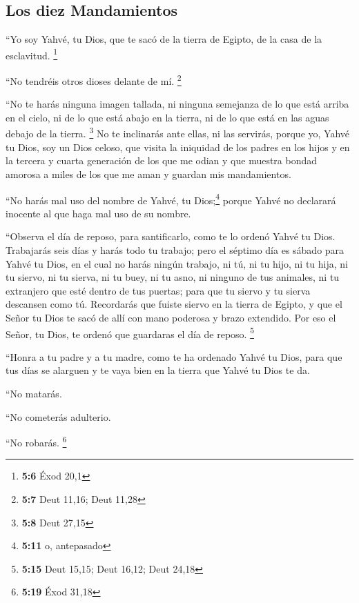 \begin{paracol}{2}
\hypertarget{los-diez-mandamientos}{%
\subsection{Los diez Mandamientos}\label{los-diez-mandamientos}}

 ``Yo soy Yahvé, tu Dios, que te sacó de la tierra de
Egipto, de la casa de la esclavitud. \footnote{\textbf{5:6} Éxod 20,1}

 ``No tendréis otros dioses delante de mí. \footnote{\textbf{5:7}
  Deut 11,16; Deut 11,28}

 ``No te harás ninguna imagen tallada, ni ninguna
semejanza de lo que está arriba en el cielo, ni de lo que está abajo en
la tierra, ni de lo que está en las aguas debajo de la tierra.
\footnote{\textbf{5:8} Deut 27,15}  No te inclinarás ante
ellas, ni las servirás, porque yo, Yahvé tu Dios, soy un Dios celoso,
que visita la iniquidad de los padres en los hijos y en la tercera y
cuarta generación de los que me odian  y que muestra
bondad amorosa a miles de los que me aman y guardan mis mandamientos.

 ``No harás mal uso del nombre de Yahvé, tu
Dios;\footnote{\textbf{5:11} o, antepasado} porque Yahvé no declarará
inocente al que haga mal uso de su nombre.

 ``Observa el día de reposo, para santificarlo, como te
lo ordenó Yahvé tu Dios.  Trabajarás seis días y harás
todo tu trabajo;  pero el séptimo día es sábado para
Yahvé tu Dios, en el cual no harás ningún trabajo, ni tú, ni tu hijo, ni
tu hija, ni tu siervo, ni tu sierva, ni tu buey, ni tu asno, ni ninguno
de tus animales, ni tu extranjero que esté dentro de tus puertas; para
que tu siervo y tu sierva descansen como tú.  Recordarás
que fuiste siervo en la tierra de Egipto, y que el Señor tu Dios te sacó
de allí con mano poderosa y brazo extendido. Por eso el Señor, tu Dios,
te ordenó que guardaras el día de reposo. \footnote{\textbf{5:15} Deut
  15,15; Deut 16,12; Deut 24,18}

 ``Honra a tu padre y a tu madre, como te ha ordenado
Yahvé tu Dios, para que tus días se alarguen y te vaya bien en la tierra
que Yahvé tu Dios te da.

 ``No matarás.

 ``No cometerás adulterio.

 ``No robarás. \footnote{\textbf{5:19} Éxod 31,18}


\end{paracol}
